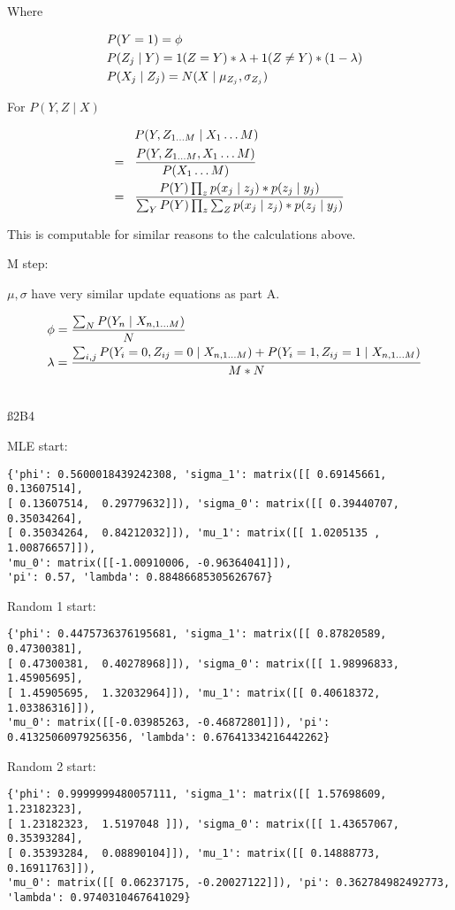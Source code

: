 Where

\begin{align*}
& P(Y=1) = \phi \\ \hspace{3 mm} &
P(Z_j \mid Y) = 1(Z=Y)*\lambda + 1(Z \neq Y) * (1-\lambda) \\ \hspace{3 mm} &
P(X_j \mid Z_j) = N(X \mid \mu_{Z_j}, \sigma_{Z_j})
\end{align*}

For $P(Y,Z \mid X)$

\begin{align*}
& P(Y,Z_{1\dots M} \mid X_1\dots M) \\ = \hspace{3 mm} &
\frac{P(Y,Z_{1\dots M}, X_1\dots M)}{P( X_1\dots M)} \\ = \hspace{3 mm} &
\frac{P(Y) \prod_{z} p(x_{j} \mid z_{j}) * p(z_{j} \mid y_{j})}{\sum_Y P(Y) \prod_{z} \sum_{Z} p(x_{j} \mid z_{j}) * p(z_{j} \mid y_{j})}
\end{align*}

This is computable for similar reasons to the calculations above.

M step:

$\mu, \sigma$ have very similar update equations as part A.

\begin{align*}
& \phi = \frac{\sum_N P(Y_n \mid X_{n,1 \dots M})}{N} \\ \hspace{3 mm} &
\lambda = \frac{\sum_{i,j} P(Y_i=0, Z_{ij}=0 \mid X_{n,1 \dots M}) + P(Y_i=1, Z_{ij}=1 \mid X_{n,1 \dots M})}{M*N} \\ \hspace{3 mm} &
\end{align*}

\ss{2B4}


MLE start: 
\begin{verbatim}
{'phi': 0.5600018439242308, 'sigma_1': matrix([[ 0.69145661,  0.13607514],
[ 0.13607514,  0.29779632]]), 'sigma_0': matrix([[ 0.39440707,  0.35034264],
[ 0.35034264,  0.84212032]]), 'mu_1': matrix([[ 1.0205135 ,  1.00876657]]),
'mu_0': matrix([[-1.00910006, -0.96364041]]),
'pi': 0.57, 'lambda': 0.88486685305626767}
\end{verbatim}

Random 1 start:
\begin{verbatim}
{'phi': 0.4475736376195681, 'sigma_1': matrix([[ 0.87820589,  0.47300381],
[ 0.47300381,  0.40278968]]), 'sigma_0': matrix([[ 1.98996833,  1.45905695],
[ 1.45905695,  1.32032964]]), 'mu_1': matrix([[ 0.40618372,  1.03386316]]),
'mu_0': matrix([[-0.03985263, -0.46872801]]), 'pi': 0.41325060979256356, 'lambda': 0.67641334216442262}
\end{verbatim}

Random 2 start:
\begin{verbatim}
{'phi': 0.9999999480057111, 'sigma_1': matrix([[ 1.57698609,  1.23182323],
[ 1.23182323,  1.5197048 ]]), 'sigma_0': matrix([[ 1.43657067,  0.35393284],
[ 0.35393284,  0.08890104]]), 'mu_1': matrix([[ 0.14888773,  0.16911763]]),
'mu_0': matrix([[ 0.06237175, -0.20027122]]), 'pi': 0.362784982492773,
'lambda': 0.9740310467641029}
\end{verbatim}

